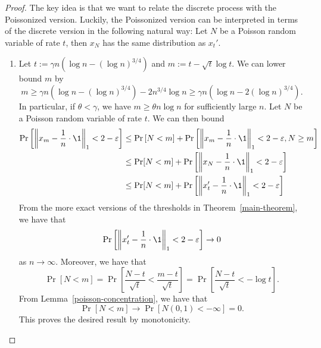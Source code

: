 \documentclass[12pt]{article}
\begin{document}
\begin{proof}
	The key idea is that we want to relate the discrete process with the Poissonized version. Luckily, the Poissonized version can be interpreted in terms of the discrete version in the following natural way: Let $N$ be a Poisson random variable of rate $t$, then $x_N$ has the same distribution as $x_t'$.  
	\begin{enumerate}[label = (\alph*)]
		\item Let $t := \gamma n (\log n - (\log n)^{3/4})$ and $m := t - \sqrt{t} \log t$. We can lower bound $m$ by
		\[
			m \geq \gamma n (\log n - (\log n)^{3/4}) - 2n^{3/4} \log n \geq \gamma n (\log n - 2 (\log n)^{3/4}).
		\]
		In particular, if $\theta < \gamma$, we have $m \geq \theta n \log n$ for sufficiently large $n$. Let $N$ be a Poisson random variable of rate $t$. We can then bound
		\begin{align*}
			\Pr \left [ \norm{x_m - \frac{1}{n} \cdot \1}_1 < 2 - \varepsilon \right ] & \leq \Pr \left [ N < m \right ] + \Pr \left [ \norm{x_m - \frac{1}{n} \cdot \1}_1 < 2 - \varepsilon, N \geq m \right ] \\
			& \leq \Pr[N < m] + \Pr \left [ \norm{x_N - \frac{1}{n} \cdot \1}_1 < 2 - \varepsilon \right ] \\
			& \leq \Pr[N < m] + \Pr \left [ \norm{x_t' - \frac{1}{n} \cdot \1}_1 < 2 - \varepsilon \right ]
		\end{align*}
		From the more exact versions of the thresholds in Theorem~\ref{main-theorem}, we have that 
		\[
			\Pr \left [ \norm{x_t' - \frac{1}{n} \cdot \1}_1 < 2 - \varepsilon \right ] \to 0
		\]
		as $n \to \infty$. Moreover, we have that 
		\[
			\Pr[N < m] = \Pr \left [ \frac{N-t}{\sqrt{t}} < \frac{m-t}{\sqrt{t}} \right ] = \Pr \left [ \frac{N-t}{\sqrt{t}} < - \log t \right ].
		\]
		From Lemma~\ref{poisson-concentration}, we have that
		\[
			\Pr[N < m] \to \Pr[N(0, 1) < -\infty] = 0.
		\]
		This proves the desired result by monotonicity.



\end{enumerate}
\end{proof}
\end{document}
